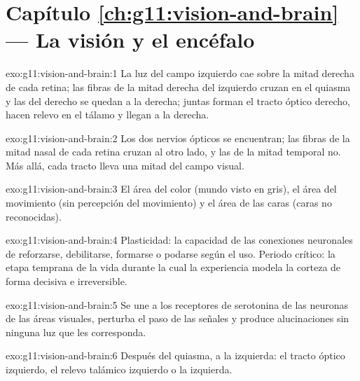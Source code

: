 \section*{Capítulo \ref{ch:g11:vision-and-brain} --- La visión y el encéfalo}

\begin{solution}{exo:g11:vision-and-brain:1}
La luz del campo izquierdo cae sobre la mitad derecha de cada retina;
las fibras de la mitad derecha del  izquierdo cruzan en el quiasma y
las del  derecho se quedan a la derecha; juntas forman el tracto
óptico derecho, hacen relevo en el tálamo y llegan a la  derecha.
\end{solution}

\begin{solution}{exo:g11:vision-and-brain:2}
Los dos nervios ópticos se encuentran; las fibras de la mitad nasal de
cada retina cruzan al otro lado, y las de la mitad temporal no. Más
allá, cada tracto lleva una mitad del campo visual.
\end{solution}

\begin{solution}{exo:g11:vision-and-brain:3}
El área del color (mundo visto en gris), el área del movimiento (sin
percepción del movimiento) y el área de las caras (caras no
reconocidas).
\end{solution}

\begin{solution}{exo:g11:vision-and-brain:4}
Plasticidad: la capacidad de las conexiones neuronales de reforzarse,
debilitarse, formarse o podarse según el uso. Periodo crítico: la etapa
temprana de la vida durante la cual la experiencia modela la corteza de
forma decisiva e irreversible.
\end{solution}

\begin{solution}{exo:g11:vision-and-brain:5}
Se une a los receptores de serotonina de las neuronas de las áreas
visuales, perturba el paso de las señales y produce alucinaciones sin
ninguna luz que les corresponda.
\end{solution}

\begin{solution}{exo:g11:vision-and-brain:6}
Después del quiasma, a la izquierda: el tracto óptico izquierdo, el
relevo talámico izquierdo o la  izquierda.
\end{solution}

